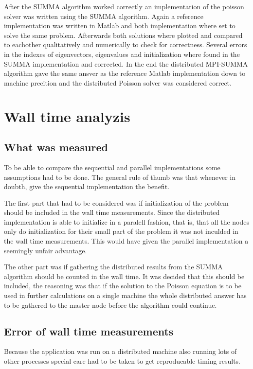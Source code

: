 \documentclass{article}
\begin{document}
After the SUMMA algorithm worked correctly an implementation of the poisson solver
was written using the SUMMA algorithm. Again a reference implementation was written
in Matlab and both implementation where set to solve the same problem. Afterwards
both solutions where plotted and compared to eachother qualitatively and numerically
to check for correctness. Several errors in the indexes of eigenvectors, eigenvalues
and initialization where found in the SUMMA implementation and corrected. In the end
the distributed MPI-SUMMA algorithm gave the same ansver as the reference Matlab implementation
down to machine precition and the distributed Poisson solver was considered correct.

\section{Wall time analyzis}

\subsection{What was measured}
To be able to compare the sequential and parallel implementations some assumptions had to
be done. The general rule of thumb was that whenever in doubth, give the sequential implementation
the benefit.

The first part that had to be considered was if initialization of the problem should be included
in the wall time measurements. Since the distributed implementation is able to initialize in
a paralell fashion, that is, that all the nodes only do initialization for their small part of the
problem it was not inculded in the wall time measurements. This would have given the parallel implementation
a seemingly unfair advantage.

The other part was if gathering the distributed results from the SUMMA algorithm
should be counted in the wall time. It was decided that this should be included,
the reasoning was that if the solution to the Poisson equation is to be used in
further calculations on a single machine the whole distributed answer has to be
gathered to the master node before the algorithm could continue.

\subsection{Error of wall time measurements}
Because the application was run on a distributed machine also running lots of
other processes special care had to be taken to get reproducable timing results.
\end{document}
